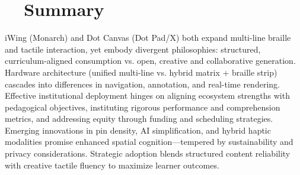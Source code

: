 \section{~~Summary}
\label{sec:sr29-summary}
iWing (Monarch) and Dot Canvas (Dot Pad/X) both expand multi-line braille and tactile interaction, yet embody divergent philosophies: structured, curriculum-aligned consumption vs. open, creative and collaborative generation. Hardware architecture (unified multi-line vs. hybrid matrix + braille strip) cascades into differences in navigation, annotation, and real-time rendering. Effective institutional deployment hinges on aligning ecosystem strengths with pedagogical objectives, instituting rigorous performance and comprehension metrics, and addressing equity through funding and scheduling strategies. Emerging innovations in pin density, AI simplification, and hybrid haptic modalities promise enhanced spatial cognition—tempered by sustainability and privacy considerations. Strategic adoption blends structured content reliability with creative tactile fluency to maximize learner outcomes.

